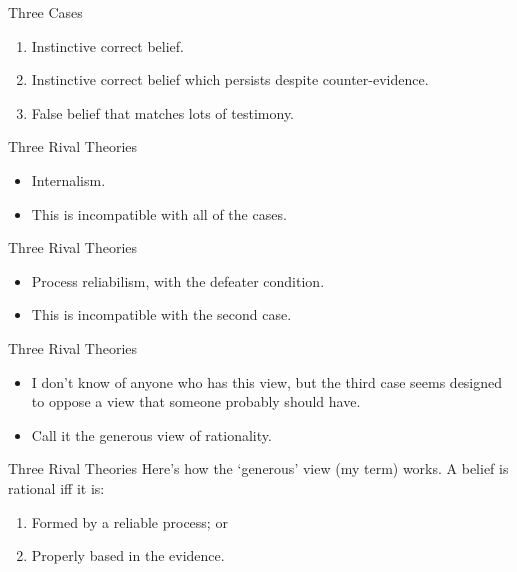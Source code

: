 \documentclass[
  17pt,
  letterpaper,
  ignorenonframetext,
  aspectratio=169,
  handout]{beamer}
\providecommand{\tightlist}{%
  \setlength{\itemsep}{0pt}\setlength{\parskip}{0pt}}\usepackage{longtable,booktabs,array}
\begin{document}
\begin{frame}{Three Cases}
\protect\hypertarget{three-cases}{}
\begin{enumerate}[<+->]
\tightlist
\item
  Instinctive correct belief.
\item
  Instinctive correct belief which persists despite counter-evidence.
\item
  False belief that matches lots of testimony.
\end{enumerate}
\end{frame}

\begin{frame}{Three Rival Theories}
\protect\hypertarget{three-rival-theories}{}
\begin{itemize}[<+->]
\tightlist
\item
  Internalism.
\item
  This is incompatible with all of the cases.
\end{itemize}
\end{frame}

\begin{frame}{Three Rival Theories}
\protect\hypertarget{three-rival-theories-1}{}
\begin{itemize}[<+->]
\tightlist
\item
  Process reliabilism, with the defeater condition.
\item
  This is incompatible with the second case.
\end{itemize}
\end{frame}

\begin{frame}{Three Rival Theories}
\protect\hypertarget{three-rival-theories-2}{}
\begin{itemize}[<+->]
\tightlist
\item
  I don't know of anyone who has this view, but the third case seems
  designed to oppose a view that someone probably should have.
\item
  Call it the generous view of rationality.
\end{itemize}
\end{frame}

\begin{frame}{Three Rival Theories}
\protect\hypertarget{three-rival-theories-3}{}
Here's how the `generous' view (my term) works. A belief is rational iff
it is:

\begin{enumerate}[<+->]
\tightlist
\item
  Formed by a reliable process; or
\item
  Properly based in the evidence.
\end{enumerate}
\end{frame}
\end{document}
